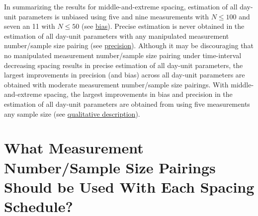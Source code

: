 \documentclass[
12pt, %
twoside,
english]{guelphthesis}
\begin{document}
In summarizing the results for middle-and-extreme spacing, estimation of all day-unit parameters is unbiased using five and nine measurements with \(N \le 100\) and seven an 11 with \(N \le 50\) (see \protect\hyperlink{bias-mid-ext-exp2}{bias}). Precise estimation is never obtained in the estimation of all day-unit parameters with any manipulated measurement number/sample size pairing (see \protect\hyperlink{precision-mid-ext-exp2}{precision}). Although it may be discouraging that no manipulated measurement number/sample size pairing under time-interval decreasing spacing results in precise estimation of all day-unit parameters, the largest improvements in precision (and bias) across all day-unit parameters are obtained with moderate measurement number/sample size pairings. With middle-and-extreme spacing, the largest improvements in bias and precision in the estimation of all day-unit parameters are obtained from using five measurements any sample size (see \protect\hyperlink{qualitative-mid-ext-exp2}{qualitative description}).

\hypertarget{what-measurement-numbersample-size-pairings-should-be-used-with-each-spacing-schedule}{%
\section{What Measurement Number/Sample Size Pairings Should be Used With Each Spacing Schedule?}\label{what-measurement-numbersample-size-pairings-should-be-used-with-each-spacing-schedule}}
\end{document}
